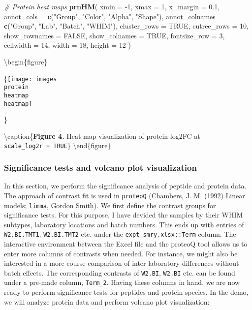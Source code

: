 \documentclass[]{article}
\newenvironment{Shaded}{\begin{snugshade}}{\end{snugshade}}
\newcommand{\CommentTok}[1]{\textcolor[rgb]{0.56,0.35,0.01}{\textit{#1}}}
\newcommand{\DataTypeTok}[1]{\textcolor[rgb]{0.13,0.29,0.53}{#1}}
\newcommand{\DecValTok}[1]{\textcolor[rgb]{0.00,0.00,0.81}{#1}}
\newcommand{\FloatTok}[1]{\textcolor[rgb]{0.00,0.00,0.81}{#1}}
\newcommand{\KeywordTok}[1]{\textcolor[rgb]{0.13,0.29,0.53}{\textbf{#1}}}
\newcommand{\NormalTok}[1]{#1}
\newcommand{\OtherTok}[1]{\textcolor[rgb]{0.56,0.35,0.01}{#1}}
\newcommand{\StringTok}[1]{\textcolor[rgb]{0.31,0.60,0.02}{#1}}
\begin{document}
\begin{Shaded}
\begin{Highlighting}[]
\CommentTok{# Protein heat maps}
\KeywordTok{prnHM}\NormalTok{(}
    \DataTypeTok{xmin =} \DecValTok{-1}\NormalTok{, }
    \DataTypeTok{xmax =} \DecValTok{1}\NormalTok{, }
    \DataTypeTok{x_margin =} \FloatTok{0.1}\NormalTok{, }
    \DataTypeTok{annot_cols =} \KeywordTok{c}\NormalTok{(}\StringTok{"Group"}\NormalTok{, }\StringTok{"Color"}\NormalTok{, }\StringTok{"Alpha"}\NormalTok{, }\StringTok{"Shape"}\NormalTok{), }
    \DataTypeTok{annot_colnames =} \KeywordTok{c}\NormalTok{(}\StringTok{"Group"}\NormalTok{, }\StringTok{"Lab"}\NormalTok{, }\StringTok{"Batch"}\NormalTok{, }\StringTok{"WHIM"}\NormalTok{), }
    \DataTypeTok{cluster_rows =} \OtherTok{TRUE}\NormalTok{, }
    \DataTypeTok{cutree_rows =} \DecValTok{10}\NormalTok{, }
    \DataTypeTok{show_rownames =} \OtherTok{FALSE}\NormalTok{, }
    \DataTypeTok{show_colnames =} \OtherTok{TRUE}\NormalTok{, }
    \DataTypeTok{fontsize_row =} \DecValTok{3}\NormalTok{, }
    \DataTypeTok{cellwidth =} \DecValTok{14}\NormalTok{, }
    \DataTypeTok{width =} \DecValTok{18}\NormalTok{, }
    \DataTypeTok{height =} \DecValTok{12}
\NormalTok{)}
\end{Highlighting}
\end{Shaded}

\textbackslash{}begin\{figure\}

\{\centering \texttt{[image: images\\protein\\heatmap\\heatmap]}

\}

\textbackslash{}caption\{\textbf{Figure 4.} Heat map visualization of
protein log2FC at
\texttt{scale\_log2r\ =\ TRUE}\}\label{fig:Protein_heatmap}
\textbackslash{}end\{figure\}

\hypertarget{significance-tests-and-volcano-plot-visualization}{%
\subsubsection{Significance tests and volcano plot
visualization}\label{significance-tests-and-volcano-plot-visualization}}

In this section, we perform the significance analysis of peptide and
protein data. The approach of contrast fit is used in \texttt{proteoQ}
(Chambers, J. M. (1992) Linear models; \texttt{limma}, Gordon Smith). We
first define the contrast groups for significance tests. For this
purpose, I have devided the samples by their WHIM subtypes, laboratory
locations and batch numbers. This ends up with entries of
\texttt{W2.BI.TMT1}, \texttt{W2.BI.TMT2} etc. under the
\texttt{expt\_smry.xlsx::Term} column. The interactive environment
between the Excel file and the proteoQ tool allows us to enter more
columns of contrasts when needed. For instance, we might also be
interested in a more course comparison of inter-laboratory differences
without batch effects. The corresponding contrasts of \texttt{W2.BI},
\texttt{W2.BI} etc. can be found under a pre-made column,
\texttt{Term\_2}. Having these columns in hand, we are now ready to
perform significance tests for peptides and protein species. In the
demo, we will analyze protein data and perform volcano plot
visualization:
\end{document}
